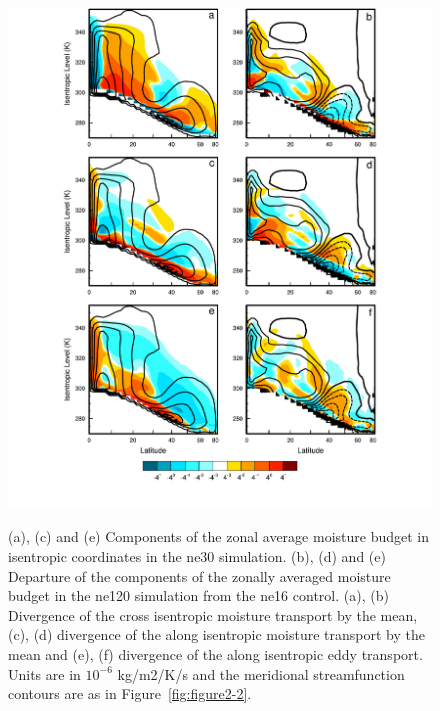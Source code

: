 \begin{figure}
\begin{center}
\noindent\includegraphics[width=30pc,angle=0]{chapter2/figure3.pdf}\\
\end{center}
\caption{(a), (c) and (e) Components of the zonal average moisture budget in isentropic coordinates in the ne30 simulation. (b), (d) and (e) Departure of the components of the zonally averaged moisture budget in the ne120 simulation from the ne16 control. (a), (b) Divergence of the cross isentropic moisture transport by the mean, (c), (d) divergence of the along isentropic moisture transport by the mean and (e), (f) divergence of the along isentropic eddy transport. Units are in $10^{-6}$ kg/m2/K/s and the meridional streamfunction contours are as in Figure~\ref{fig:figure2-2}.}
\label{fig:figure2-3}
\end{figure}

